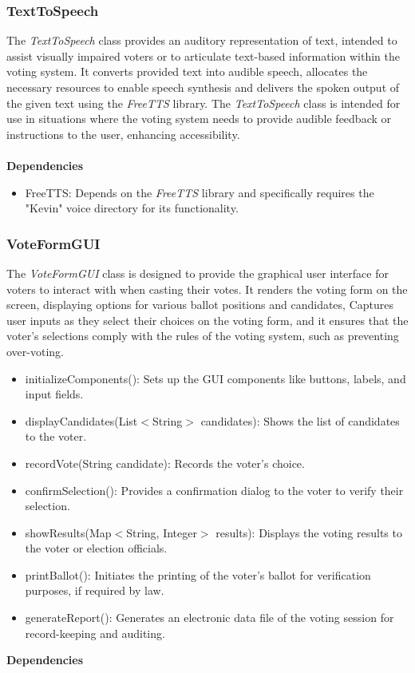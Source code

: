 \documentclass{article}
\begin{document}
\subsubsection{TextToSpeech}
The \textit{TextToSpeech} class provides an auditory representation of text, intended to assist visually impaired voters or to articulate text-based information within the voting system. It converts provided text into audible speech, allocates the necessary resources to enable speech synthesis and delivers the spoken output of the given text using the \textit{FreeTTS} library. The \textit{TextToSpeech} class is intended for use in situations where the voting system needs to provide audible feedback or instructions to the user, enhancing accessibility.\\ \\
\textbf{Dependencies}

\begin{itemize}
    \item FreeTTS: Depends on the \textit{FreeTTS} library and specifically requires the "Kevin" voice directory for its functionality.
\end{itemize}

\subsubsection{VoteFormGUI}
The \textit{VoteFormGUI} class is designed to provide the graphical user interface for voters to interact with when casting their votes. It renders the voting form on the screen, displaying options for various ballot positions and candidates, Captures user inputs as they select their choices on the voting form, and it ensures that the voter's selections comply with the rules of the voting system, such as preventing over-voting.

\begin{itemize}
    \item initializeComponents(): Sets up the GUI components like buttons, labels, and input fields.
    \item displayCandidates(List$<$String$>$ candidates): Shows the list of candidates to the voter.
    \item recordVote(String candidate): Records the voter's choice.
    \item confirmSelection(): Provides a confirmation dialog to the voter to verify their selection.
    \item showResults(Map$<$String, Integer$>$ results): Displays the voting results to the voter or election officials.
    \item printBallot(): Initiates the printing of the voter's ballot for verification purposes, if required by law.
    \item generateReport(): Generates an electronic data file of the voting session for record-keeping and auditing.
\end{itemize}
\textbf{Dependencies}
\end{document}
